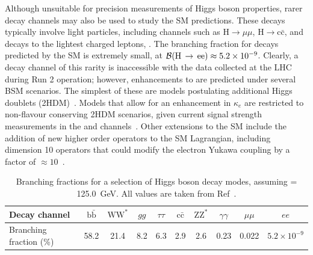 Although unsuitable for precision measurements of Higgs boson properties, rarer decay channels may also be used to study the SM predictions. These decays typically involve light particles, including channels such as $\mathrm{H}\rightarrow\mu\mu$, $\mathrm{H}\rightarrow \mathrm{c}\bar{\mathrm{c}}$, and decays to the lightest charged leptons, \Hee. The branching fraction for \Hee decays predicted by the SM is extremely small, at $\mathcal{B}(\mathrm{H}\,\rightarrow\,\mathrm{ee}) \approx 5.2\times10^{-9}$. Clearly, a decay channel of this rarity is inaccessible with the data collected at the LHC during Run 2 operation; however, enhancements to \BHee are predicted under several BSM scenarios. The simplest of these are models postulating additional Higgs doublets (2HDM)~\cite{BSM_vecferm,BSM_2HDM}. Models that allow for an enhancement in $\kappa_e$ are restricted to non-flavour conserving 2HDM scenarios, given current signal strength measurements in the \Hmumu and \Htautau channels~\cite{CMSHMuMu,CMSHtautau,ATLASHtautau}. Other extensions to the SM include the addition of new higher order operators to the SM Lagrangian, including dimension 10 operators that could modify the electron Yukawa coupling by a factor of ${\approx}10$~\cite{dim_ten_operators}. 

\begin{table}[htbp!]
\centering
\caption[Branching fractions for selected Higgs boson decay modes, assuming $\mH= 125.0$~GeV.]{Branching fractions for a selection of Higgs boson decay modes, assuming \mH= 125.0~GeV. All values are taken from Ref~\cite{YR4}.}
\label{tab:higgs_decay_brs}
\begin{tabular}{l|ccccccccc}
\hline
Decay channel          & $\mathrm{b}\bar{\mathrm{b}}$ & $\mathrm{WW}^{*}$ & $gg$ & $\tau\tau$ & $\mathrm{c}\bar{\mathrm{c}}$ & $\mathrm{Z}\mathrm{Z}^{*}$ & $\gamma\gamma$ & $\mu\mu$ & $ee$ \\ \hline
Branching fraction (\%) & 58.2                        & 21.4    & 8.2  & 6.3       & 2.9       & 2.6     & 0.23           & 0.022     & $5.2\times10^{-9}$\\                                                                              
\hline
\end{tabular}                  
\end{table}  


